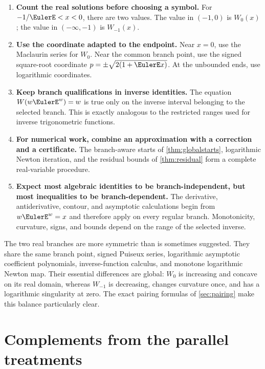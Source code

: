 \documentclass[11pt]{article}
\theoremstyle{remark}
\begin{document}
\begin{enumerate}[label=\textbf{Step \arabic*.},leftmargin=*]
\item \textbf{Count the real solutions before choosing a symbol.}
For \(-1/\EulerE<x<0\), there are two values.  The value in \((-1,0)\) is
\(W_0(x)\); the value in \(( -\infty,-1)\) is \(W_{-1}(x)\).

\item \textbf{Use the coordinate adapted to the endpoint.}
Near \(x=0\), use the Maclaurin series for \(W_0\).  Near the common branch
point, use the signed square-root coordinate
\(p=\pm\sqrt{2(1+\EulerE x)}\).  At the unbounded ends, use logarithmic
coordinates.

\item \textbf{Keep branch qualifications in inverse identities.}
The equation \(W(w\EulerE^w)=w\) is true only on the inverse interval belonging
to the selected branch.  This is exactly analogous to the restricted ranges
used for inverse trigonometric functions.

\item \textbf{For numerical work, combine an approximation with a
correction and a certificate.}
The branch-aware starts of \cref{thm:globalstarts}, logarithmic Newton
iteration, and the residual bounds of \cref{thm:residual} form a complete
real-variable procedure.

\item \textbf{Expect most algebraic identities to be branch-independent,
but most inequalities to be branch-dependent.}
The derivative, antiderivative, contour, and asymptotic calculations begin
from \(w\EulerE^w=x\) and therefore apply on every regular branch.  Monotonicity,
curvature, signs, and bounds depend on the range of the selected inverse.
\end{enumerate}

The two real branches are more symmetric than is sometimes suggested.
They share the same branch point, signed Puiseux series, logarithmic
asymptotic coefficient polynomials, inverse-function calculus, and monotone
logarithmic Newton map.  Their essential differences are global: \(W_0\) is
increasing and concave on its real domain, whereas \(W_{-1}\) is decreasing,
changes curvature once, and has a logarithmic singularity at zero.  The exact
pairing formulas of \cref{sec:pairing} make this balance particularly clear.

\section{Complements from the parallel treatments}\label{sec:complements}
\end{document}
